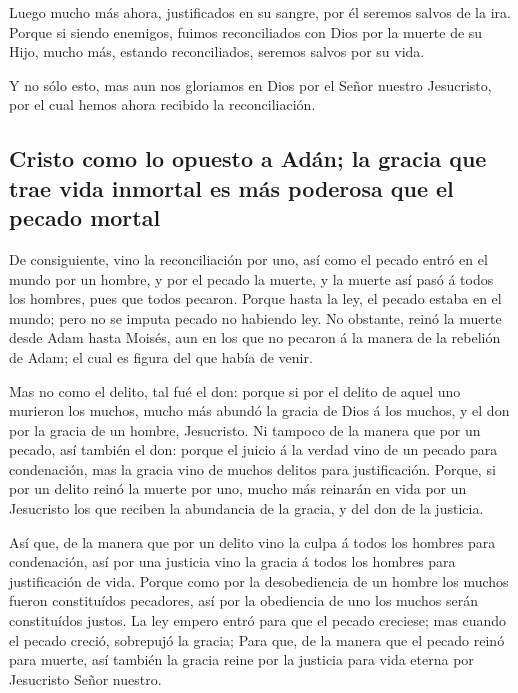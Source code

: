  Luego mucho más ahora, justificados en su sangre, por él
seremos salvos de la ira.  Porque si siendo enemigos,
fuimos reconciliados con Dios por la muerte de su Hijo, mucho más,
estando reconciliados, seremos salvos por su vida.

 Y no sólo esto, mas aun nos gloriamos en Dios por el
Señor nuestro Jesucristo, por el cual hemos ahora recibido la
reconciliación.

\hypertarget{cristo-como-lo-opuesto-a-aduxe1n-la-gracia-que-trae-vida-inmortal-es-muxe1s-poderosa-que-el-pecado-mortal}{%
\subsection{Cristo como lo opuesto a Adán; la gracia que trae vida
inmortal es más poderosa que el pecado
mortal}\label{cristo-como-lo-opuesto-a-aduxe1n-la-gracia-que-trae-vida-inmortal-es-muxe1s-poderosa-que-el-pecado-mortal}}

 De consiguiente, vino la reconciliación por uno, así
como el pecado entró en el mundo por un hombre, y por el pecado la
muerte, y la muerte así pasó á todos los hombres, pues que todos
pecaron.  Porque hasta la ley, el pecado estaba en el
mundo; pero no se imputa pecado no habiendo ley.  No
obstante, reinó la muerte desde Adam hasta Moisés, aun en los que no
pecaron á la manera de la rebelión de Adam; el cual es figura del que
había de venir.

 Mas no como el delito, tal fué el don: porque si por el
delito de aquel uno murieron los muchos, mucho más abundó la gracia de
Dios á los muchos, y el don por la gracia de un hombre, Jesucristo.
 Ni tampoco de la manera que por un pecado, así también
el don: porque el juicio á la verdad vino de un pecado para condenación,
mas la gracia vino de muchos delitos para justificación. 
Porque, si por un delito reinó la muerte por uno, mucho más reinarán en
vida por un Jesucristo los que reciben la abundancia de la gracia, y del
don de la justicia.

 Así que, de la manera que por un delito vino la culpa á
todos los hombres para condenación, así por una justicia vino la gracia
á todos los hombres para justificación de vida.  Porque
como por la desobediencia de un hombre los muchos fueron constituídos
pecadores, así por la obediencia de uno los muchos serán constituídos
justos.  La ley empero entró para que el pecado creciese;
mas cuando el pecado creció, sobrepujó la gracia;  Para
que, de la manera que el pecado reinó para muerte, así también la gracia
reine por la justicia para vida eterna por Jesucristo Señor nuestro.

